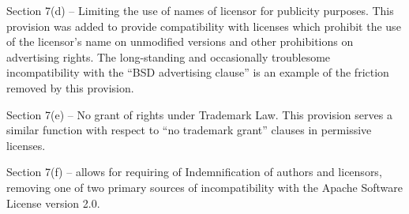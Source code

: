 Section 7(d) – Limiting the use of names of licensor for publicity
purposes. This provision was added to provide compatibility with licenses
which prohibit the use of the licensor’s name on unmodified versions and
other prohibitions on advertising rights. The long-standing and occasionally
troublesome incompatibility with the ``BSD advertising clause'' is an example
of the friction removed by this provision.

Section 7(e) – No grant of rights under Trademark Law. This provision serves
a similar function with respect to ``no trademark grant'' clauses in permissive
licenses.

Section 7(f) – allows for requiring of Indemnification of authors and
licensors, removing one of two primary sources of incompatibility with the
Apache Software License version 2.0.





